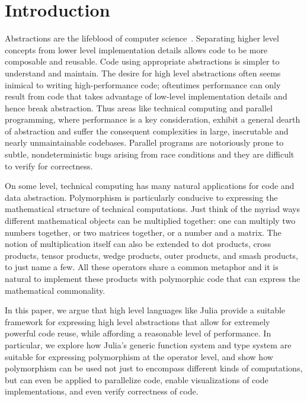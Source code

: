 \documentclass{sig-alternate}
\begin{document}


\listoftodos

\section{Introduction}

Abstractions are the lifeblood of computer science~\cite{Abelson1996}.
Separating higher level concepts from lower level implementation details allows
code to be more composable and reusable. Code using appropriate abstractions is
simpler to understand and maintain. The desire for high level abstractions
often seems inimical to writing high-performance code; oftentimes performance
can only result from code that takes advantage of low-level implementation
details and hence break abstraction. Thus areas like technical computing and
parallel programming, where performance is a key consideration, exhibit a
general dearth of abstraction and suffer the consequent complexities in large,
inscrutable and nearly unmaintainable codebases. Parallel programs are
notoriously prone to subtle, nondeterministic bugs arising from race conditions
and they are difficult to verify for correctness. 

On some level, technical computing has many natural applications for code and
data abstraction. Polymorphism is particularly conducive to expressing the
mathematical structure of technical computations. Just think of the myriad ways
different mathematical objects can be multiplied together: one can multiply two
numbers together, or two matrices together, or a number and a matrix. The
notion of multiplication itself can also be extended to dot products, cross
products, tensor products, wedge products, outer products, and smash products,
to just name a few. All these operators share a common metaphor and it is
natural to implement these products with polymorphic code that can express the
mathematical commonality.

In this paper, we argue that high level languages like Julia provide a suitable
framework for expressing high level abstractions that allow for extremely
powerful code reuse, while affording a reasonable level of performance.
In particular, we explore how Julia's generic function system and type system
are suitable for expressing polymorphism at the operator level, and show
how polymorphism can be used not just to encompass different kinds of
computations, but can even be applied to parallelize code, enable
visualizations of code implementations, and even verify correctness of code.
\end{document}
